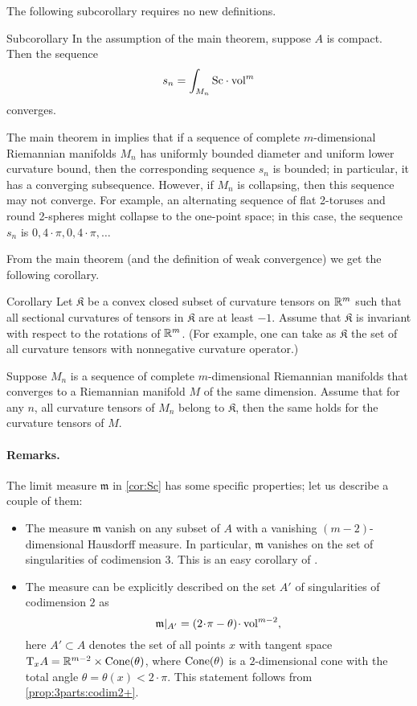 The following subcorollary requires no new definitions.

\begin{thm}{Subcorollary}\label{cor:cor:Sc}
In the assumption of the main theorem, suppose $A$ is compact.
Then the sequence
\[s_n=\int_{M_n}\Sc \cdot\vol^m\]
converges.
\end{thm}

The main theorem in \cite{petrunin-SC} implies that if a sequence of complete $m$-dimensional Riemannian  manifolds $M_n$ has uniformly bounded diameter and uniform lower curvature bound, then 
the corresponding sequence $s_n$ is bounded;
in particular, it has a converging subsequence.
However, if $M_n$ is collapsing, then this sequence may not converge.
For example, an alternating sequence of flat 2-toruses and round 2-spheres might collapse to the one-point space; in this case, the sequence $s_n$ is $0,4\cdot\pi,0,4\cdot\pi,\dots$

From the main theorem (and the definition of weak convergence) we get the following corollary.

\begin{thm}{Corollary}
Let $\mathfrak{K}$ be a convex closed subset of curvature tensors on $\mathbb{R}^m$ 
such that 
all sectional curvatures of tensors in $\mathfrak{K}$ are at least $-1$.
Assume that $\mathfrak{K}$ is invariant with respect to the rotations of $\mathbb{R}^m$.
(For example, one can take as $\mathfrak{K}$ the set of all curvature tensors with nonnegative curvature operator.)

Suppose $M_n$ is a sequence of complete $m$-dimensional Riemannian manifolds that converges to a Riemannian manifold $M$ of the same dimension.
Assume that for any $n$, all curvature tensors of $M_n$ belong to $\mathfrak{K}$, 
then the same holds for the curvature tensors of $M$.
\end{thm}



\paragraph{Remarks.}
The limit measure $\mathfrak m$ in \ref{cor:Sc} has some specific properties;
let us describe a couple of them:
\begin{itemize}
\item The measure $\mathfrak m$ vanish on any subset of $A$ with a vanishing $(m-2)$-dimensional Hausdorff measure.
In particular, $\mathfrak m$ vanishes on the set of singularities of codimension 3.
This is an easy corollary of \cite{petrunin-SC}.

\item The measure can be explicitly described on the set $A'$ of singularities
of codimension $2$ as 
$$\mathfrak m|_{A'}=(2\cdot \pi-\theta)\cdot \vol^{m-2},$$
here $A'\subset A$
denotes the set of all points $x$ with tangent space
$\T_xA\zz=\R^{m-2}\zz\times \Cone(\theta)$,
where $\operatorname{Cone}(\theta)$ is a $2$-dimensional cone
with the total angle $\theta=\theta(x)<2\cdot\pi$.
This statement follows from \ref{prop:3parts:codim2+}.
\end{itemize}

